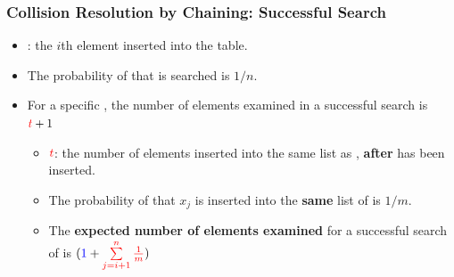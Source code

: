 \documentclass[UTF8,11pt]{beamer}
\begin{document}
\begin{frame}
\frametitle{Collision Resolution by Chaining: Successful Search}
\begin{block}{}
	\begin{center}	
		\pause
		\begin{itemize}
			\pause\item {}: the $i$th element inserted into the table.
			\pause\item The probability of that  is searched is $1/n$.
			\pause\item For a specific , the number of elements examined in a successful search is $\textcolor{red}{t}+1$
			\begin{itemize}
				\pause\item $\textcolor{red}{t}$: the number of elements inserted into the same list as , \textbf{after}  has been inserted.
				\pause\item The probability of that $x_j$ is inserted into the \textbf{same} list of  is $1/m$.
				\pause\item The \textbf{\color{blue}expected number of elements examined} for a successful search of  is {$(\textcolor{blue}{1}+\textcolor{red}{\sum\limits_{j=i+1}^{n}{\frac{1}{m}}})$}
			\end{itemize}
		\end{itemize}
	\end{center}
\end{block}
\end{frame}
\end{document}

